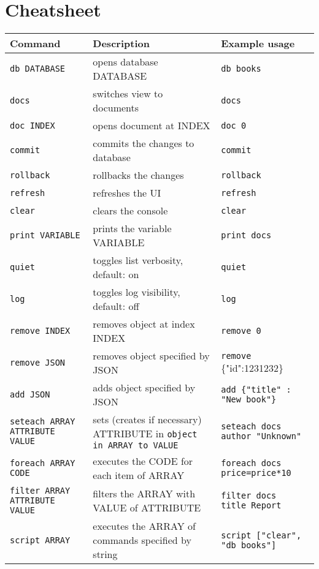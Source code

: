 \section*{Cheatsheet}
\centering
\begin{tabularx}{\textwidth}{ | l | X | l | }
\hline
\textbf{Command} & \textbf{Description} & \textbf{Example usage} \\ \hline 
\verb|db DATABASE| &
opens database DATABASE &
\verb|db books| \\ \hline

\verb|docs| &
switches view to documents &
\verb|docs| \\ \hline

\verb|doc INDEX| &
opens document at INDEX &
\verb|doc 0| \\ \hline

\verb|commit| &
commits the changes to database &
\verb|commit| \\ \hline

\verb|rollback| &
rollbacks the changes &
\verb|rollback| \\ \hline

\verb|refresh| &
refreshes the UI &
\verb|refresh| \\ \hline

\verb|clear| &
clears the console &
\verb|clear| \\ \hline

\verb|print VARIABLE| &
prints the variable VARIABLE &
\verb|print docs| \\ \hline

\verb|quiet| &
toggles list verbosity, default: on &
\verb|quiet| \\ \hline

\verb|log| &
toggles log visibility, default: off &
\verb|log| \\ \hline

\verb|remove INDEX|&
removes object at index INDEX &
\verb|remove 0| \\ \hline

\verb|remove JSON| &
removes object specified by JSON &
\verb|remove| \{"id":1231232\} \\ \hline

\verb|add JSON| &
 adds object specified by JSON &
\verb|add {"title" : "New book"}| \\ \hline
 
\verb|seteach ARRAY ATTRIBUTE VALUE| &
sets (creates if necessary) ATTRIBUTE in \verb|object in ARRAY to VALUE| &
\verb|seteach docs author "Unknown"| \\ \hline

\verb|foreach ARRAY CODE| &
executes the CODE for each item of ARRAY &
\verb|foreach docs price=price*10| \\ \hline

\verb|filter ARRAY ATTRIBUTE VALUE| &
filters the ARRAY with VALUE of ATTRIBUTE &
\verb|filter docs  title Report| \\ \hline

\verb|script ARRAY| &
executes the ARRAY of commands specified by string &
\verb|script ["clear", "db books"]| \\ \hline
\end{tabularx}
